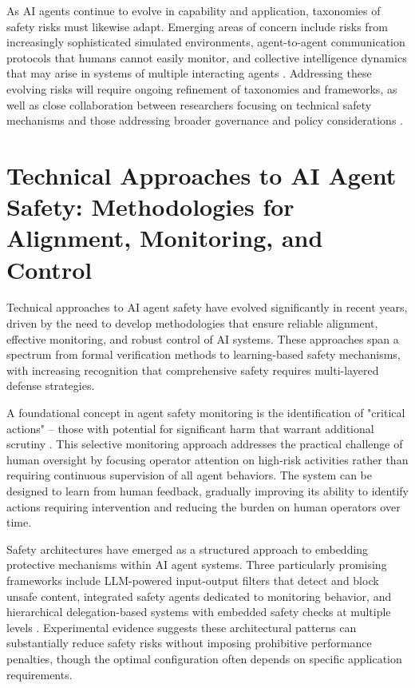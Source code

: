 \documentclass[conference]{IEEEtran}
\begin{document}
As AI agents continue to evolve in capability and application, taxonomies of safety risks must likewise adapt. Emerging areas of concern include risks from increasingly sophisticated simulated environments, agent-to-agent communication protocols that humans cannot easily monitor, and collective intelligence dynamics that may arise in systems of multiple interacting agents \cite{2502.14143}. Addressing these evolving risks will require ongoing refinement of taxonomies and frameworks, as well as close collaboration between researchers focusing on technical safety mechanisms and those addressing broader governance and policy considerations \cite{2412.01957}.



\section{Technical Approaches to AI Agent Safety: Methodologies for Alignment, Monitoring, and Control}

Technical approaches to AI agent safety have evolved significantly in recent years, driven by the need to develop methodologies that ensure reliable alignment, effective monitoring, and robust control of AI systems. These approaches span a spectrum from formal verification methods to learning-based safety mechanisms, with increasing recognition that comprehensive safety requires multi-layered defense strategies.

A foundational concept in agent safety monitoring is the identification of "critical actions" – those with potential for significant harm that warrant additional scrutiny \cite{2201.04632}. This selective monitoring approach addresses the practical challenge of human oversight by focusing operator attention on high-risk activities rather than requiring continuous supervision of all agent behaviors. The system can be designed to learn from human feedback, gradually improving its ability to identify actions requiring intervention and reducing the burden on human operators over time.

Safety architectures have emerged as a structured approach to embedding protective mechanisms within AI agent systems. Three particularly promising frameworks include LLM-powered input-output filters that detect and block unsafe content, integrated safety agents dedicated to monitoring behavior, and hierarchical delegation-based systems with embedded safety checks at multiple levels \cite{2409.03793}. Experimental evidence suggests these architectural patterns can substantially reduce safety risks without imposing prohibitive performance penalties, though the optimal configuration often depends on specific application requirements.
\end{document}
